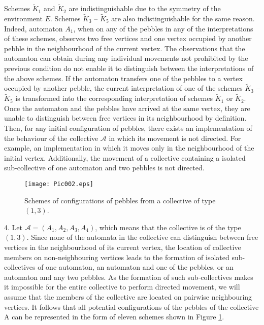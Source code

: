 \documentclass{article}
\newenvironment{proof}[1][Proof]{\begin{trivlist}
\item[\hskip \labelsep {\bfseries #1}]}{\end{trivlist}}
\begin{document}
\begin{proof}
Schemes $\widetilde K_{1}$ and $\widetilde K_{2}$ are indistinguishable due to the symmetry of the environment $E$.
Schemes $\widetilde K_{3}$ -- $\widetilde K_{5}$ are also indistinguishable for the same reason.
Indeed, automaton $A_{1}$, when on any of the pebbles in any of the interpretations of these schemes, observes two free vertices and one vertex occupied by another pebble in the neighbourhood of the current vertex.
The observations that the automaton can obtain during any individual movements not prohibited by the previous condition do not enable it to distinguish between the interpretations of the above schemes.
If the automaton transfers one of the pebbles to a vertex occupied by another pebble, the current interpretation of one of the schemes $\widetilde K_{3}$ -- $\widetilde K_{5}$ is transformed into the corresponding interpretation of schemes $\widetilde K_{1}$ or $\widetilde K_{2}$.
Once the automaton and the pebbles have arrived at the same vertex, they are unable to distinguish between free vertices in its neighbourhood by definition.
Then, for any initial configuration of pebbles, there exists an implementation of the behaviour of the collective $\mathcal{A}$ in which its movement is not directed. 
For example, an implementation in which it moves only in the neighbourhood of the initial vertex. 
Additionally, the movement of a collective containing a isolated sub-collective of one automaton and two pebbles is not directed.

\begin{figure}[h]
	\centering
	\texttt{[image: Pic002.eps]}
	\caption{Schemes of configurations of pebbles from a collective of type $(1, 3)$.}
	\label{fig:fig2}
\end{figure}

4. Let $\mathcal{A} = \left( A_{1}, A_{2}, A_{3}, A_{4} \right)$, which means that the collective is of the type $(1, 3)$.
Since none of the automata in the collective can distinguish between free vertices in the neighbourhood of its current vertex, the location of collective members on non-neighbouring vertices leads to the formation of isolated sub-collectives of one automaton, an automaton and one of the pebbles, or an automaton and any two pebbles.
As the formation of such sub-collectives makes it impossible for the entire collective to perform directed movement, we will assume that the members of the collective are located on pairwise neighbouring vertices.
It follows that all potential configurations of the pebbles of the collective A can be represented in the form of eleven schemes shown in Figure \ref{fig:fig2}.


\end{proof}
\end{document}
